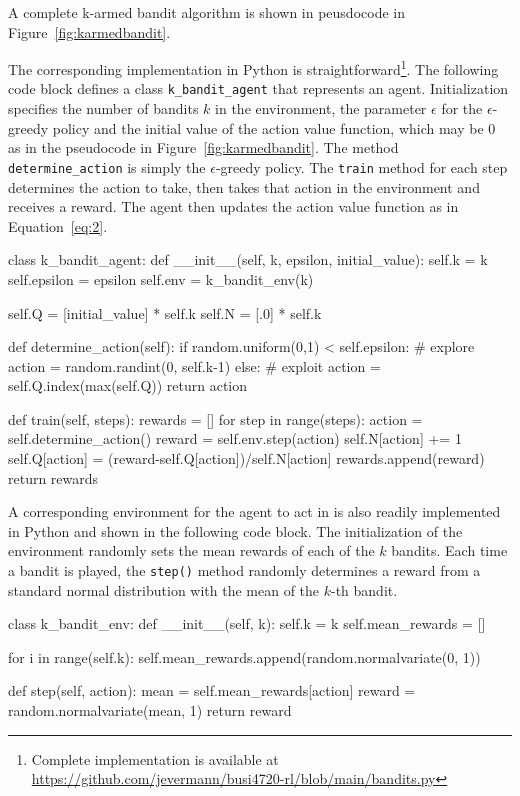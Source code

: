A complete k-armed bandit algorithm is shown in peusdocode in Figure~\ref{fig:karmedbandit}.
\begin{withcode}
The corresponding implementation in Python is straightforward\footnote{Complete implementation is available at \url{https://github.com/jevermann/busi4720-rl/blob/main/bandits.py}}. The following code block defines a class \texttt{k\_bandit\_agent} that represents an agent. Initialization specifies the number of bandits $k$ in the environment, the parameter $\epsilon$ for the $\epsilon$-greedy policy and the initial value of the action value function, which may be 0 as in the pseudocode in Figure~\ref{fig:karmedbandit}. The method \texttt{determine\_action} is simply the $\epsilon$-greedy policy. The \texttt{train} method for each step determines the action to take, then takes that action in the environment and receives a reward. The agent then updates the action value function as in Equation~\ref{eq:2}.

\begin{pythoncode}
class k_bandit_agent:
    def __init__(self, k, epsilon, initial_value):
        self.k = k
        self.epsilon = epsilon
        self.env = k_bandit_env(k)

        self.Q = [initial_value] * self.k
        self.N = [.0] * self.k

    def determine_action(self):
        if random.uniform(0,1) < self.epsilon:
            # explore
            action = random.randint(0, self.k-1)
        else:
            # exploit
            action = self.Q.index(max(self.Q))
        return action

    def train(self, steps):
        rewards = []
        for step in range(steps):
            action = self.determine_action()
            reward = self.env.step(action)
            self.N[action] += 1
            self.Q[action] = (reward-self.Q[action])/self.N[action]
            rewards.append(reward)
        return rewards
\end{pythoncode}

A corresponding environment for the agent to act in is also readily implemented in Python and shown in the following code block. The initialization of the environment randomly sets the mean rewards of each of the $k$ bandits. Each time a bandit is played, the \texttt{step()} method randomly determines a reward from a standard normal distribution with the mean of the $k$-th bandit.

\begin{pythoncode}
class k_bandit_env:
    def __init__(self, k):
        self.k = k
        self.mean_rewards = []

        for i in range(self.k):
            self.mean_rewards.append(random.normalvariate(0, 1))

    def step(self, action):
        mean = self.mean_rewards[action]
        reward = random.normalvariate(mean, 1)
        return reward
\end{pythoncode}
\end{withcode}

